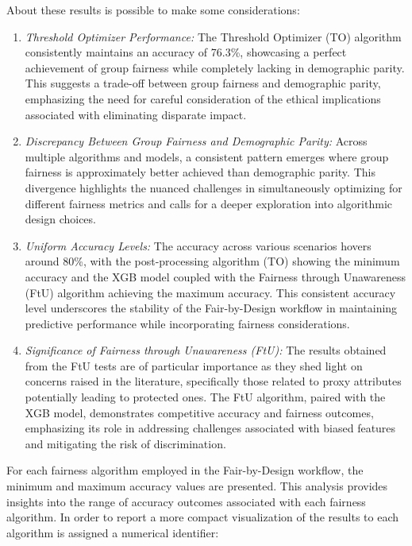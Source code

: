 About these results is possible to make some considerations:
\begin{enumerate}
    \item \emph{Threshold Optimizer Performance:} The Threshold Optimizer (TO) algorithm consistently maintains an accuracy of 76.3\%, showcasing a perfect achievement of group fairness while completely lacking in demographic parity. This suggests a trade-off between group fairness and demographic parity, emphasizing the need for careful consideration of the ethical implications associated with eliminating disparate impact.
    
    \item \emph{Discrepancy Between Group Fairness and Demographic Parity:} Across multiple algorithms and models, a consistent pattern emerges where group fairness is approximately better achieved than demographic parity. This divergence highlights the nuanced challenges in simultaneously optimizing for different fairness metrics and calls for a deeper exploration into algorithmic design choices.
    
    \item \emph{Uniform Accuracy Levels:} The accuracy across various scenarios hovers around 80\%, with the post-processing algorithm (TO) showing the minimum accuracy and the XGB model coupled with the Fairness through Unawareness (FtU) algorithm achieving the maximum accuracy. This consistent accuracy level underscores the stability of the Fair-by-Design workflow in maintaining predictive performance while incorporating fairness considerations.
    
    \item \emph{Significance of Fairness through Unawareness (FtU):} The results obtained from the FtU tests are of particular importance as they shed light on concerns raised in the literature, specifically those related to proxy attributes potentially leading to protected ones. The FtU algorithm, paired with the XGB model, demonstrates competitive accuracy and fairness outcomes, emphasizing its role in addressing challenges associated with biased features and mitigating the risk of discrimination.
\end{enumerate}

For each fairness algorithm employed in the Fair-by-Design workflow, the minimum and maximum accuracy values are presented. This analysis provides insights into the range of accuracy outcomes associated with each fairness algorithm.
In order to report a more compact visualization of the results to each algorithm is assigned a numerical identifier:

